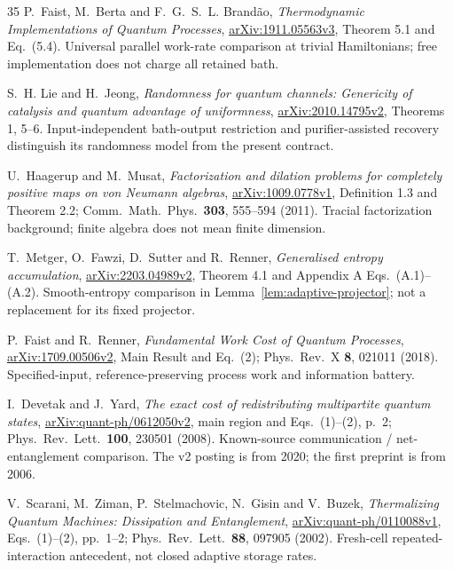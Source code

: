\documentclass[11pt,a4paper]{article}
\numberwithin{equation}{section}
\theoremstyle{plain}
\theoremstyle{definition}
\begin{document}
\begin{thebibliography}{35}
P.~Faist, M.~Berta and F.~G.~S.~L. Brand\~ao, \emph{Thermodynamic
Implementations of Quantum Processes},
\href{https://arxiv.org/html/1911.05563v3}{arXiv:1911.05563v3}, Theorem 5.1
and Eq.~(5.4). Universal parallel work-rate comparison at trivial
Hamiltonians; free implementation does not charge all retained bath.

S.~H. Lie and H.~Jeong, \emph{Randomness for quantum channels: Genericity of
catalysis and quantum advantage of uniformness},
\href{https://arxiv.org/pdf/2010.14795v2}{arXiv:2010.14795v2},
Theorems 1, 5--6. Input-independent bath-output restriction and
purifier-assisted recovery distinguish its randomness model from the present
contract.

U.~Haagerup and M.~Musat, \emph{Factorization and dilation problems for
completely positive maps on von Neumann algebras},
\href{https://arxiv.org/pdf/1009.0778v1}{arXiv:1009.0778v1}, Definition 1.3
and Theorem 2.2; Comm.\ Math.\ Phys.\ \textbf{303}, 555--594 (2011). Tracial
factorization background; finite algebra does not mean finite dimension.

T.~Metger, O.~Fawzi, D.~Sutter and R.~Renner, \emph{Generalised entropy
accumulation},
\href{https://arxiv.org/html/2203.04989v2}{arXiv:2203.04989v2}, Theorem 4.1
and Appendix A Eqs.~(A.1)--(A.2). Smooth-entropy comparison in
Lemma~\ref{lem:adaptive-projector}; not a replacement for its fixed projector.

P.~Faist and R.~Renner, \emph{Fundamental Work Cost of Quantum Processes},
\href{https://arxiv.org/pdf/1709.00506v2}{arXiv:1709.00506v2}, Main Result and
Eq.~(2); Phys.\ Rev.\ X \textbf{8}, 021011 (2018). Specified-input,
reference-preserving process work and information battery.

I.~Devetak and J.~Yard, \emph{The exact cost of redistributing multipartite
quantum states},
\href{https://arxiv.org/pdf/quant-ph/0612050v2}{arXiv:quant-ph/0612050v2},
main region and Eqs.~(1)--(2), p.~2; Phys.\ Rev.\ Lett.\ \textbf{100}, 230501
(2008). Known-source communication / net-entanglement comparison. The v2
posting is from 2020; the first preprint is from 2006.

V.~Scarani, M.~Ziman, P.~Stelmachovic, N.~Gisin and V.~Buzek,
\emph{Thermalizing Quantum Machines: Dissipation and Entanglement},
\href{https://arxiv.org/pdf/quant-ph/0110088v1}{arXiv:quant-ph/0110088v1},
Eqs.~(1)--(2), pp.~1--2; Phys.\ Rev.\ Lett.\ \textbf{88}, 097905 (2002).
Fresh-cell repeated-interaction antecedent, not closed adaptive storage rates.


\end{thebibliography}
\end{document}

